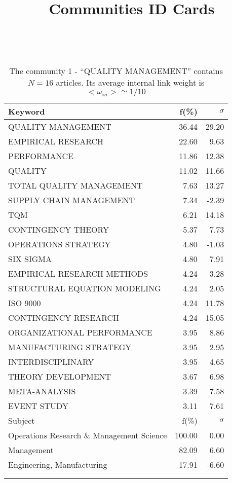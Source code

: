 \documentclass[a4paper,11pt]{report}
\title{{\bf Communities ID Cards}}
\date{\begin{flushleft}This document gather the ``ID Cards'' of the CC communities found within your database.\\
 The CC network was built by keeping a link between articles sharing at least 5 references. The communities characterized here correspond to the ones found in the level 1 (in the sense of the Louvain algo) which gathers more than 0 articles.\\
 These ID cards displays the most frequent keywords, subject categories, journals of publication, institution, countries, authors, references and reference journals of the articles of each community. The significance of an item $\sigma = \sqrt{N} (f - p) / \sqrt{p(1-p)}$ [where $N$ is the number of articles within the community and $f$ and $p$ are the proportion of articles respectively within the community and within the database displaying that item ] is also given (for example $\sigma > 5$ is really highly significant).\\
\vspace{1cm}
\copyright Sebastian Grauwin, Liu Weizhi - (2014) \end{flushleft}}
\begin{document}
\begin{landscape}
\maketitle
\clearpage

\begin{table}[!ht]
\caption{The community 1 - ``QUALITY MANAGEMENT'' contains $N = 16$ articles. Its average internal link weight is $<\omega_{in}> \simeq 1/10$ }
\textcolor{white}{aa}\\
{\scriptsize\begin{tabular}{|l r r|}
\hline
Keyword & f(\%) & $\sigma$\\
\hline
QUALITY MANAGEMENT & 36.44 & 29.20\\
EMPIRICAL RESEARCH & 22.60 & 9.63\\
PERFORMANCE & 11.86 & 12.38\\
QUALITY & 11.02 & 11.66\\
TOTAL QUALITY MANAGEMENT & 7.63 & 13.27\\
SUPPLY CHAIN MANAGEMENT & 7.34 & -2.39\\
TQM & 6.21 & 14.18\\
CONTINGENCY THEORY & 5.37 & 7.73\\
OPERATIONS STRATEGY & 4.80 & -1.03\\
SIX SIGMA & 4.80 & 7.91\\
EMPIRICAL RESEARCH METHODS & 4.24 & 3.28\\
STRUCTURAL EQUATION MODELING & 4.24 & 2.05\\
ISO 9000 & 4.24 & 11.78\\
CONTINGENCY RESEARCH & 4.24 & 15.05\\
ORGANIZATIONAL PERFORMANCE & 3.95 & 8.86\\
MANUFACTURING STRATEGY & 3.95 & 2.95\\
INTERDISCIPLINARY & 3.95 & 4.65\\
THEORY DEVELOPMENT & 3.67 & 6.98\\
META-ANALYSIS & 3.39 & 7.58\\
EVENT STUDY & 3.11 & 7.61\\
\hline
\hline
Subject & f(\%) & $\sigma$\\
\hline
Operations Research \& Management Science & 100.00 & 0.00\\
Management & 82.09 & 6.60\\
Engineering, Manufacturing & 17.91 & -6.60\\
 &  & \\
 &  & \\

\end{tabular}}
\end{table}
\end{landscape}
\end{document}
